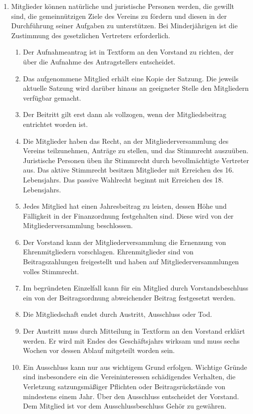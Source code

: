 \documentclass[12pt,a4paper]{article}
\begin{document}
\begin{enumerate}
\item Mitglieder können natürliche und juristische Personen werden, die gewillt sind, die gemeinnützigen Ziele des Vereins zu fördern und diesen in der Durchführung seiner Aufgaben zu unterstützen. Bei Minderjährigen ist die Zustimmung des gesetzlichen Vertreters erforderlich.
\begin{enumerate}
\item Der Aufnahmeantrag ist in Textform an den Vorstand zu richten, der über die Aufnahme des Antragstellers entscheidet.
\item Das aufgenommene Mitglied erhält eine Kopie der Satzung. Die jeweils aktuelle Satzung wird darüber hinaus an geeigneter Stelle den Mitgliedern verfügbar gemacht.
\item Der Beitritt gilt erst dann als vollzogen, wenn der Mitgliedsbeitrag entrichtet worden ist.
\item Die Mitglieder haben das Recht, an der Mitgliederversammlung des Vereins teilzunehmen, Anträge zu stellen, und das Stimmrecht auszuüben. Juristische Personen üben ihr Stimmrecht durch bevollmächtigte Vertreter aus. Das aktive Stimmrecht besitzen Mitglieder mit Erreichen des 16. Lebensjahrs. Das passive Wahlrecht beginnt mit Erreichen des 18. Lebensjahrs.
\item Jedes Mitglied hat einen Jahresbeitrag zu leisten, dessen Höhe und Fälligkeit in der Finanzordnung festgehalten sind. Diese wird von der Mitgliederversammlung beschlossen.
\item Der Vorstand kann der Mitgliederversammlung die Ernennung von Ehrenmitgliedern vorschlagen. Ehrenmitglieder sind von Beitragszahlungen freigestellt und haben auf Mitgliederversammlungen volles Stimmrecht.
\item Im begründeten Einzelfall kann für ein Mitglied durch Vorstandsbeschluss ein von der Beitragsordnung abweichender Beitrag festgesetzt werden.
\item Die Mitgliedschaft endet durch Austritt, Ausschluss oder Tod.
\item Der Austritt muss durch Mitteilung in Textform an den Vorstand erklärt werden. Er wird mit Endes des Geschäftsjahrs wirksam und muss sechs Wochen vor dessen Ablauf mitgeteilt worden sein.
\item Ein Ausschluss kann nur aus wichtigem Grund erfolgen. Wichtige Gründe sind insbesondere ein die Vereininteressen schädigendes Verhalten, die Verletzung satzungsmäßiger Pflichten oder Beitragsrückstände von mindestens einem Jahr. Über den Ausschluss entscheidet der Vorstand. Dem Mitglied ist vor dem Ausschlussbeschluss Gehör zu gewähren.

\end{enumerate}
\end{enumerate}
\end{document}
